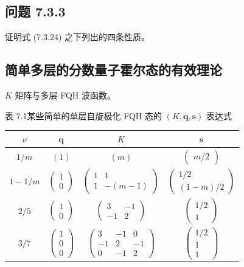 \subsection*{问题 7.3.3}
证明式 (7.3.24) 之下列出的四条性质。

\subsection{简单多层的分数量子霍尔态的有效理论}

\begin{keypoints}
\item $K$ 矩阵与多层 FQH 波函数。
\end{keypoints}

\begin{center}
\small 表 7.1\quad 某些简单的单层自旋极化 FQH 态的 $(K,\boldsymbol{q},\boldsymbol{s})$ 表达式\\[6pt]
\begin{tabular}{cccc}
\toprule
$\nu$ & $\boldsymbol{q}$ & $K$ & $\boldsymbol{s}$ \\
\midrule
$1/m$ & $(1)$ & $(m)$ & $\begin{pmatrix} m/2 \end{pmatrix}$ \\[10pt]
$1-1/m$ & $\begin{pmatrix}1\\0\end{pmatrix}$ &
$\begin{pmatrix}1 & 1\\ 1 & -(m-1)\end{pmatrix}$ &
$\begin{pmatrix}1/2\\ (1-m)/2\end{pmatrix}$ \\[18pt]
$2/5$ & $\begin{pmatrix}1\\0\end{pmatrix}$ &
$\begin{pmatrix}3 & -1\\ -1 & 2\end{pmatrix}$ &
$\begin{pmatrix}1/2\\ 1\end{pmatrix}$ \\[18pt]
$3/7$ & $\begin{pmatrix}1\\0\\0\end{pmatrix}$ &
$\begin{pmatrix}3 & -1 & 0\\ -1 & 2 & -1\\ 0 & -1 & 2\end{pmatrix}$ &
$\begin{pmatrix}1/2\\ 1\\ 1\end{pmatrix}$ \\
\bottomrule
\end{tabular}
\end{center}

